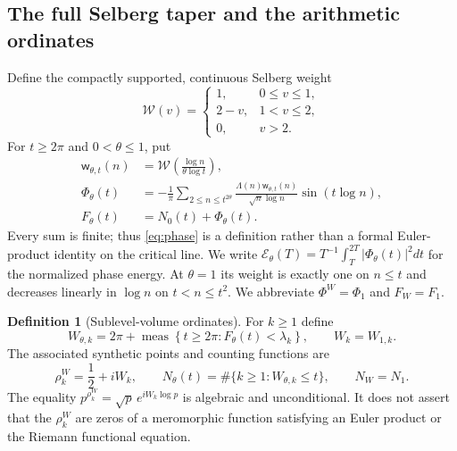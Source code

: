 \documentclass[11pt,leqno]{amsart}
\numberwithin{equation}{section}
\theoremstyle{definition}
\newtheorem{definition}[theorem]{Definition}
\theoremstyle{remark}
\newcommand{\1}{\mathbf 1}
\newcommand{\meas}{\operatorname{meas}}
\newcommand{\tW}{\mathscr W}
\newcommand{\wt}{\mathsf w}
\begin{document}
\subsection{The full Selberg taper and the arithmetic ordinates}\label{subsec:basic-def}
Define the compactly supported, continuous Selberg weight
\begin{equation}\label{eq:Selberg-weight}
 \tW(v)=\begin{cases}1,&0\le v\le1,\\2-v,&1<v\le2,\\0,&v>2.\end{cases}
\end{equation}
For $t\ge2\pi$ and $0<\theta\le1$, put
\begin{align}
 \wt_{\theta,t}(n)&=\tW\left(\frac{\log n}{\theta\log t}\right),\label{eq:mobile-weight}\\
 \Phi_\theta(t)&=-\frac1\pi\sum_{2\le n\le t^{2\theta}}
 \frac{\Lambda(n)\wt_{\theta,t}(n)}{\sqrt n\log n}\sin(t\log n),\label{eq:phase}\\
 F_\theta(t)&=N_0(t)+\Phi_\theta(t).\label{eq:count-phase}
\end{align}
Every sum is finite; thus \eqref{eq:phase} is a definition rather than a formal Euler-product identity on the critical line. We write $\mathcal E_\theta(T)=T^{-1}\int_T^{2T}|\Phi_\theta(t)|^2dt$ for the normalized phase energy. At $\theta=1$ its weight is exactly one on $n\le t$ and decreases linearly in $\log n$ on $t<n\le t^2$. We abbreviate $\Phi^W=\Phi_1$ and $F_W=F_1$.
\begin{definition}[Sublevel-volume ordinates]\label{def:W}
For $k\ge1$ define
\begin{equation}\label{eq:sublevel}
 \boxed{\displaystyle W_{\theta,k}=2\pi+\meas\left\{t\ge2\pi:F_\theta(t)<\lambda_k\right\},\qquad W_k=W_{1,k}.}
\end{equation}
The associated synthetic points and counting functions are
\begin{equation}\label{eq:synthetic}
 \rho^W_k=\frac12+iW_k,\qquad
 N_\theta(t)=\#\{k\ge1:W_{\theta,k}\le t\},\qquad N_W=N_1.
\end{equation}
The equality $p^{\rho_k^W}=\sqrt p\,e^{iW_k\log p}$ is algebraic and unconditional. It does not assert that the $\rho_k^W$ are zeros of a meromorphic function satisfying an Euler product or the Riemann functional equation.
\end{definition}
\end{document}
